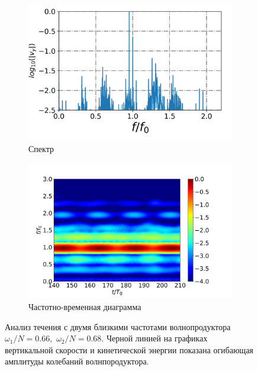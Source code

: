 \documentclass[utf8x]{G7-32} %
\begin{document}
\begin{figure}[h!]
\begin{subfigure}[с]{0.45\textwidth}
    \includegraphics[width=1.1\textwidth]{../pics/H40L60N1ap05dp20w1p63Deltawp05Biharm/spectrumX35p6Y11p2.png}
    \caption{Спектр}
  \end{subfigure}
  \begin{subfigure}[с]{0.45\textwidth}
    \includegraphics[width=1.1\textwidth]{../pics/H40L60N1ap05dp20w1p63Deltawp05Biharm/TFspectrumX35p6Y11p2N200.png}
    \caption{Частотно-временная диаграмма}
    \label{}
  \end{subfigure}
  \caption{
Анализ течения 
    с двумя 
  близкими 
частотами волнопродуктора $\omega_1/N=0.66,$ $\omega_2/N=0.68$. Черной линией  на графиках вертикальной скорости и кинетической энергии показана огибающая амплитуды колебаний волнпородуктора.}
  \label{fig:biharmVyap005-1}
\end{figure}
\end{document}
